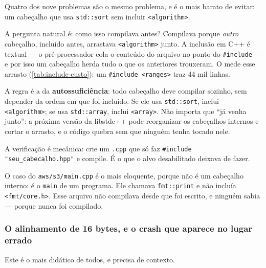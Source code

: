 Quatro dos nove problemas são o mesmo problema, e é o mais barato de evitar: um
cabeçalho que usa \texttt{std::sort} sem incluir \texttt{<algorithm>}.

A pergunta natural é: como isso compilava antes? Compilava porque \emph{outro}
cabeçalho, incluído antes, arrastava \texttt{<algorithm>} junto. A inclusão em
C++ é textual --- o pré-processador cola o conteúdo do arquivo no ponto do
\texttt{\#include} --- e por isso um cabeçalho herda tudo o que os anteriores
trouxeram. O  mede esse arrasto (\cref{tab:include-custo}): um
\texttt{\#include <ranges>} traz 44 mil linhas.

\begin{armadilha}
A regra é a da \textbf{autossuficiência}: todo cabeçalho deve compilar sozinho,
sem depender da ordem em que foi incluído. Se ele usa \texttt{std::sort},
inclui \texttt{<algorithm>}; se usa \texttt{std::array}, inclui
\texttt{<array>}. Não importa que ``já venha junto'': a próxima versão da
libstdc++ pode reorganizar os cabeçalhos internos e cortar o arrasto, e o
código quebra sem que ninguém tenha tocado nele.

A verificação é mecânica: crie um \texttt{.cpp} que só faz
\texttt{\#include "seu\_cabecalho.hpp"} e compile. É o que o alvo desabilitado
deixava de fazer.
\end{armadilha}

O caso do \texttt{aws/s3/main.cpp} é o mais eloquente, porque não é um
cabeçalho interno: é o \texttt{main} de um programa. Ele chamava
\texttt{fmt::print} e não incluía \texttt{<fmt/core.h>}. Esse arquivo não
compilava desde que foi escrito, e ninguém sabia --- porque nunca foi
compilado.

\subsubsection{O alinhamento de 16 bytes, e o crash que aparece no lugar errado}

Este é o mais didático de todos, e precisa de contexto.

